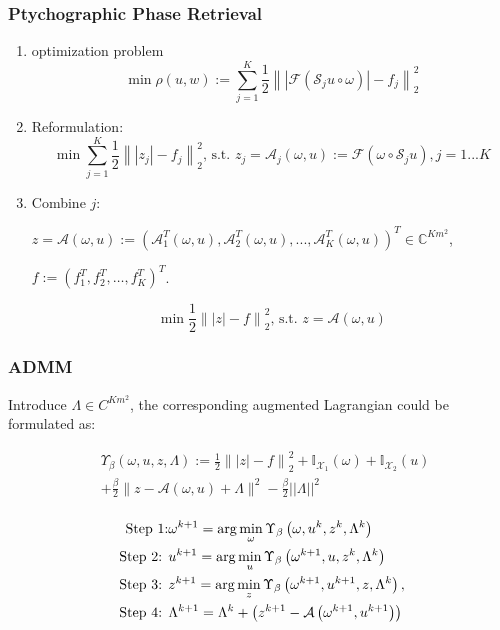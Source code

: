 \documentclass[UTF8]{beamer}
\begin{document}
\begin{frame}[c]\frametitle{Ptychographic Phase Retrieval}

\begin{enumerate}
\item optimization problem
$$
\min \rho(u,w):=\sum_{j=1}^{K} \frac{1}{2}\left\|\left|\mathcal{F} ( \mathcal{S}_{j} u  \circ \omega)\right|-f_{j}\right\|_{2}^{2}
$$
\item Reformulation:
$$
\min \sum_{j=1}^{K} \frac{1}{2}\left\|\left|z_{j}\right|-f_{j}\right\|_{2}^{2} \text {, s.t. } z_{j}= \mathcal{A}_{j}(\omega, u):=\mathcal{F}\left(\omega \circ \mathcal{S}_{j} u\right),j=1... K
$$

\item Combine $j$:


$z = \mathcal{A}(\omega, u) := \left(\mathcal{A}_{1}^{T}(\omega, u), \mathcal{A}_{2}^{T}(\omega, u),..., \mathcal{A}_{K}^{T}(\omega, u)\right)^{T} 
\in \mathbb{C}^{ Km^2}$,

$f := (f_1^T,f_2^T, \ldots, f_K^T)^T$.

$$
\min \frac{1}{2}\left\|\left|z\right|-f\right\|_{2}^{2} \text {, s.t. } z= \mathcal{A}(\omega, u)
$$

\end{enumerate}


\end{frame}

\begin{frame}[c]\frametitle{ADMM}

Introduce $\Lambda \in C^{Km^2}$,
the corresponding augmented Lagrangian could be formulated as:

\begin{equation}
\begin{aligned}
&\Upsilon_{\beta}(\omega, u, z, \Lambda):=\frac{1}{2}\left\|\left|z\right|-f\right\|_{2}^{2}+\mathbb{I}_{\mathcal{X}_{1}}(\omega)+\mathbb{I}_{\mathcal{X}_{2}}(u)  \\
&+ \frac{\beta}{2}  \| z - \mathcal{A}(\omega, u) + \Lambda \|^{2} - \frac{\beta}{2}||\Lambda||^2 \\
\end{aligned}
\end{equation} 

$$
\begin{aligned}
\text {Step 1:} & \omega^{k+1}=\arg \min _{\omega} \Upsilon_{\beta}\left(\omega, u^{k}, z^{k}, \Lambda^{k}\right) \notag \\
 \text { Step 2: } & u^{k+1}=\arg \min _{u} \Upsilon_{\beta}\left(\omega^{k+1}, u, z^{k}, \Lambda^{k}\right) \notag \\ 
 \text { Step 3: } & z^{k+1}=\arg \min _{z} \Upsilon_{\beta}\left(\omega^{k+1}, u^{k+1}, z, \Lambda^{k}\right), \notag \\
\text { Step 4: } &
 \Lambda^{k+1}=\Lambda^{k}+\left(z^{k+1}-\mathcal{A}\left(\omega^{k+1}, u^{k+1}\right)\right)  \label{Lup}
\end{aligned}
$$

\end{frame}
\end{document}
